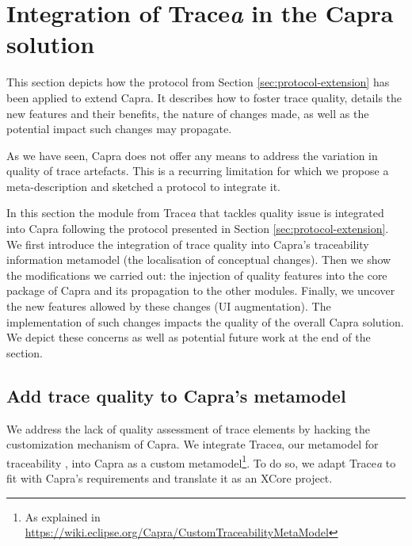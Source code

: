 \section{Integration of Trace\textit{a} in the Capra solution}\label{sec:extension}
This section depicts how the protocol from Section \ref{sec:protocol-extension} has been applied to extend Capra. It describes how to foster trace quality, details the new features and their benefits, the nature of changes made, as well as the potential impact such changes may propagate.
\sideboxend

As we have seen, Capra does not offer any means to address the variation in quality of trace artefacts. This is a recurring limitation for which we propose a meta-description and sketched a protocol to integrate it. 

In this section the module from Trace\textit{a} that tackles quality issue is integrated into Capra following the protocol presented in Section \ref{sec:protocol-extension}.
We first introduce the integration of trace quality into Capra's traceability information metamodel (the localisation of conceptual changes). Then we show the modifications we carried out: the injection of quality features into the core package of Capra and its propagation to the other modules. 
Finally, we uncover the new features allowed by these changes (UI augmentation).
The implementation of such changes impacts the quality of the overall Capra solution. We depict these concerns as well as potential future work at the end of the section.


\subsection{Add trace quality to Capra's metamodel}
We address the lack of quality assessment of trace elements by hacking the customization mechanism of Capra. We integrate Trace\textit{a}, our metamodel for traceability \cite{batot2021-not-another-metamodel}, into Capra as a custom metamodel\footnote{As explained in \url{https://wiki.eclipse.org/Capra/CustomTraceabilityMetaModel}}. To do so, we adapt Trace\textit{a} to fit with Capra's requirements and translate it as an XCore project. 

